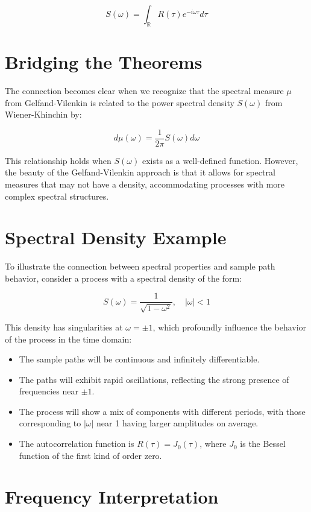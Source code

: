 \documentclass{article}
\begin{document}
\[S(\omega) = \int_{\mathbb{R}} R(\tau) e^{-i\omega\tau} d\tau\]

\section{Bridging the Theorems}

The connection becomes clear when we recognize that the spectral measure $\mu$ from Gelfand-Vilenkin is related to the power spectral density $S(\omega)$ from Wiener-Khinchin by:

\[d\mu(\omega) = \frac{1}{2\pi} S(\omega) d\omega\]

This relationship holds when $S(\omega)$ exists as a well-defined function. However, the beauty of the Gelfand-Vilenkin approach is that it allows for spectral measures that may not have a density, accommodating processes with more complex spectral structures.

\section{Spectral Density Example}

To illustrate the connection between spectral properties and sample path behavior, consider a process with a spectral density of the form:

\[S(\omega) = \frac{1}{\sqrt{1 - \omega^2}}, \quad |\omega| < 1\]

This density has singularities at $\omega = \pm 1$, which profoundly influence the behavior of the process in the time domain:

\begin{itemize}
    \item The sample paths will be continuous and infinitely differentiable.
    \item The paths will exhibit rapid oscillations, reflecting the strong presence of frequencies near $\pm 1$.
    \item The process will show a mix of components with different periods, with those corresponding to $|\omega|$ near 1 having larger amplitudes on average.
    \item The autocorrelation function is $R(\tau) = J_0(\tau)$, where $J_0$ is the Bessel function of the first kind of order zero.
\end{itemize}

\section{Frequency Interpretation}
\end{document}
